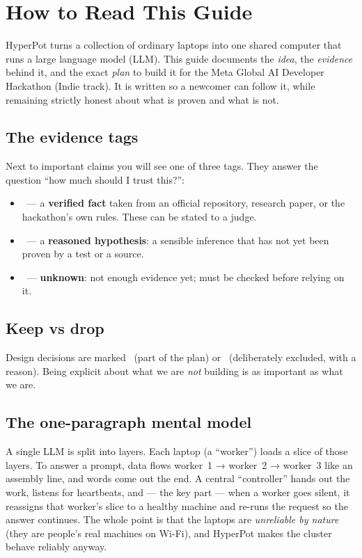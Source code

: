 \section{How to Read This Guide}

HyperPot turns a collection of ordinary laptops into one shared computer that
runs a large language model (LLM). This guide documents the \emph{idea}, the
\emph{evidence} behind it, and the exact \emph{plan} to build it for the Meta
Global AI Developer Hackathon (Indie track). It is written so a newcomer can
follow it, while remaining strictly honest about what is proven and what is not.

\subsection{The evidence tags}
Next to important claims you will see one of three tags. They answer the
question ``how much should I trust this?'':

\begin{itemize}[leftmargin=1.4em,nosep]
  \item \VER\ --- a \textbf{verified fact} taken from an official repository,
  research paper, or the hackathon's own rules. These can be stated to a judge.
  \item \HYP\ --- a \textbf{reasoned hypothesis}: a sensible inference that has
  not yet been proven by a test or a source.
  \item \UNK\ --- \textbf{unknown}: not enough evidence yet; must be checked
  before relying on it.
\end{itemize}

\subsection{Keep vs drop}
Design decisions are marked \Keep\ (part of the plan) or \Drop\ (deliberately
excluded, with a reason). Being explicit about what we are \emph{not} building
is as important as what we are.

\subsection{The one-paragraph mental model}
A single LLM is split into layers. Each laptop (a ``worker'') loads a slice of
those layers. To answer a prompt, data flows worker~1 → worker~2 → worker~3 like
an assembly line, and words come out the end. A central ``controller'' hands out
the work, listens for heartbeats, and --- the key part --- when a worker goes
silent, it reassigns that worker's slice to a healthy machine and re-runs the
request so the answer continues. The whole point is that the laptops are
\emph{unreliable by nature} (they are people's real machines on Wi-Fi), and
HyperPot makes the cluster behave reliably anyway.

